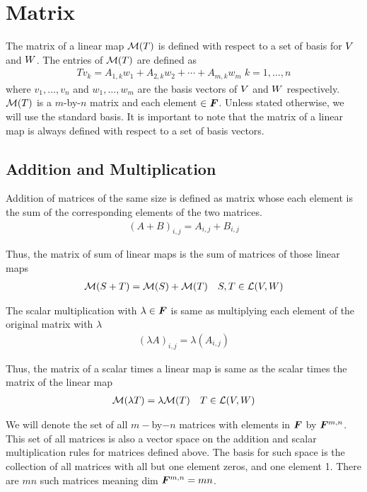 \documentclass[../../linear_algebra.tex]{subfiles}
\begin{document}
\section{Matrix}
The matrix of a linear map $\mathcal{M}(T)$ is defined with respect to a set of basis for $V$ and $W$. The entries of $\mathcal{M}(T)$ are defined as
\begin{align*}
    Tv_{k} = A_{1,k}w_{1} + A_{2,k}w_{2} + \cdots + A_{m,k}w_{m} \; k=1,\ldots, n
\end{align*}
where $v_{1}, \ldots, v_{n}$ and $w_{1}, \ldots, w_{m}$ are the basis vectors of $V$ and $W$ respectively. $\mathcal{M}(T)$ is a $m$-by-$n$ matrix and each element $\in \bm{F}$. Unless stated otherwise, we will use the standard basis.\newline
It is important to note that the matrix of a linear map is always defined with respect to a set of basis vectors.


\subsection{Addition and Multiplication}
Addition of matrices of the same size is defined as matrix whose each element is the sum of the corresponding elements of the two matrices.
\begin{align*}
    (A+B)_{i,j} = A_{i,j} + B_{i,j}
\end{align*}

Thus, the matrix of sum of linear maps is the sum of matrices of those linear maps
\begin{align*}
    \mathcal{M}(S + T) = \mathcal{M}(S) + \mathcal{M}(T) \quad S, T \in \mathcal{L}(V, W)
\end{align*}

The scalar multiplication with $\lambda \in \bm{F}$ is same as multiplying each element of the original matrix with $\lambda$
\begin{align*}
    (\lambda A)_{i,j} = \lambda (A_{i,j})
\end{align*}

Thus, the matrix of a scalar times a linear map is same as the scalar times the matrix of the linear map
\begin{align*}
    \mathcal{M}(\lambda T) = \lambda \mathcal{M}(T) \quad T \in \mathcal{L}(V, W)
\end{align*}

We will denote the set of all $m-$by$-n$ matrices with elements in $\bm{F}$ by $\bm{F}^{m,n}$. This set of all matrices is also a vector space on the addition and scalar multiplication rules for matrices defined above. The basis for such space is the collection of all matrices with all but one element zeros, and one element 1. There are $mn$ such matrices meaning dim $\bm{F}^{m,n} = mn$.
\end{document}
